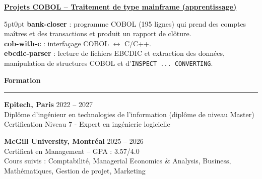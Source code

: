 \documentclass[9pt]{extarticle}
\begin{document}
\par\vspace{8pt}

\underline{\bfseries Projets COBOL -- Traitement de type mainframe (apprentissage)}
\par
\begin{adjustwidth}{5pt}{0pt}
    \textbf{bank-closer} : programme COBOL (195 lignes) qui prend des comptes maîtres et des transactions et produit un rapport de clôture. \\
    \textbf{cob-with-c} : interfaçage COBOL $\leftrightarrow$ C/C++. \\
    \textbf{ebcdic-parser} : lecture de fichiers EBCDIC et extraction des données, manipulation de structures COBOL et d'\texttt{INSPECT ... CONVERTING}.
\end{adjustwidth}

\par\vspace{8pt}

{\large\bfseries Formation}
\par\vspace{-8pt}
\rule{\linewidth}{0.4pt}
\par\vspace{5pt}

{\bfseries Epitech, Paris} \hfill 2022 -- 2027 \\
Diplôme d'ingénieur en technologies de l'information (diplôme de niveau Master) \\
Certification Niveau 7 - Expert en ingénierie logicielle

\vspace{6pt}

{\bfseries McGill University, Montréal} \hfill 2025 -- 2026 \\
Certificat en Management -- GPA : 3.57/4.0 \\
Cours suivis : Comptabilité, Managerial Economics \& Analysis, Business, Mathématiques, Gestion de projet, Marketing
\end{document}
